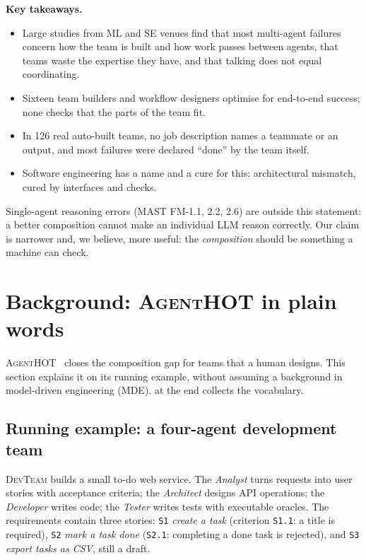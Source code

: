 \documentclass[10pt,a4paper]{article}
\newcommand{\tool}{\textsc{AgentHOT}}
\newcommand{\devteam}{\textsc{DevTeam}}
\newcommand{\code}[1]{\texttt{#1}}
\newenvironment{takeaway}{%
  \begin{tcolorbox}[enhanced, colback=keybg, colframe=keybg, arc=0pt, boxrule=0pt,
     borderline west={2.2pt}{0pt}{keybar}, left=8pt, right=8pt, top=5pt, bottom=5pt,
     before skip=8pt, after skip=8pt]
  \textsf{\bfseries\color{keybar}Key takeaways.}\par\smallskip}{\end{tcolorbox}}
\begin{document}
\begin{takeaway}
\begin{itemize}
\item Large studies from ML and SE venues find that most multi-agent
failures concern how the team is built and how work passes between agents,
that teams waste the expertise they have, and that talking does not equal
coordinating.
\item Sixteen team builders and workflow designers optimise for end-to-end success; none checks
that the parts of the team fit.
\item In 126 real auto-built teams, no job description names a teammate or
an output, and most failures were declared ``done'' by the team itself.
\item Software engineering has a name and a cure for this: architectural
mismatch, cured by interfaces and checks.
\end{itemize}
\end{takeaway}

Single-agent reasoning errors (MAST FM-1.1, 2.2, 2.6) are outside this
statement: a better composition cannot make an individual LLM reason
correctly. Our claim is narrower and, we believe, more useful: the
\emph{composition} should be something a machine can check.
\section{Background: \tool{} in plain words}\label{sec:background}

\tool{}~\cite{agenthot2026} closes the composition gap for teams that a
human designs. This section explains it on its running example, without
assuming a background in model-driven engineering (MDE). 
at the end collects the vocabulary.

\subsection{Running example: a four-agent development team}

\devteam{} builds a small to-do web service. The \emph{Analyst} turns
requests into user stories with acceptance criteria; the \emph{Architect}
designs API operations; the \emph{Developer} writes code; the \emph{Tester}
writes tests with executable oracles. The requirements contain three
stories: \code{S1} \emph{create a task} (criterion \code{S1.1}: a title is
required), \code{S2} \emph{mark a task done} (\code{S2.1}: completing a
done task is rejected), and \code{S3} \emph{export tasks as CSV}, still a
draft.
\end{document}
